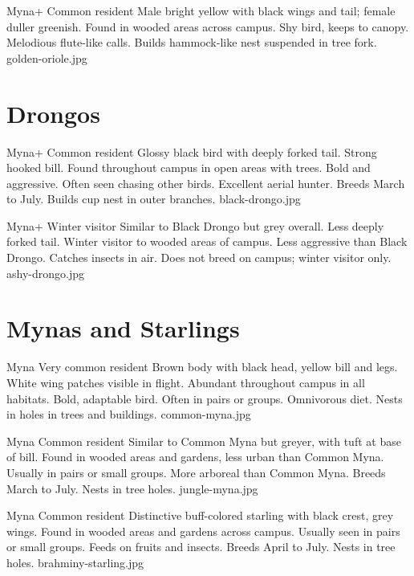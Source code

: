 \documentclass[aspectratio=169]{beamer}
\begin{document}
{Myna+}
{Common resident}
{Male bright yellow with black wings and tail; female duller greenish.}
{Found in wooded areas across campus.}
{Shy bird, keeps to canopy. Melodious flute-like calls.}
{Builds hammock-like nest suspended in tree fork.}
{golden-oriole.jpg}

\section{Drongos}
{Myna+}
{Common resident}
{Glossy black bird with deeply forked tail. Strong hooked bill.}
{Found throughout campus in open areas with trees.}
{Bold and aggressive. Often seen chasing other birds. Excellent aerial hunter.}
{Breeds March to July. Builds cup nest in outer branches.}
{black-drongo.jpg}

{Myna+}
{Winter visitor}
{Similar to Black Drongo but grey overall. Less deeply forked tail.}
{Winter visitor to wooded areas of campus.}
{Less aggressive than Black Drongo. Catches insects in air.}
{Does not breed on campus; winter visitor only.}
{ashy-drongo.jpg}

\section{Mynas and Starlings}
{Myna}
{Very common resident}
{Brown body with black head, yellow bill and legs. White wing patches visible in flight.}
{Abundant throughout campus in all habitats.}
{Bold, adaptable bird. Often in pairs or groups. Omnivorous diet.}
{Nests in holes in trees and buildings.}
{common-myna.jpg}

{Myna}
{Common resident}
{Similar to Common Myna but greyer, with tuft at base of bill.}
{Found in wooded areas and gardens, less urban than Common Myna.}
{Usually in pairs or small groups. More arboreal than Common Myna.}
{Breeds March to July. Nests in tree holes.}
{jungle-myna.jpg}

{Myna}
{Common resident}
{Distinctive buff-colored starling with black crest, grey wings.}
{Found in wooded areas and gardens across campus.}
{Usually seen in pairs or small groups. Feeds on fruits and insects.}
{Breeds April to July. Nests in tree holes.}
{brahminy-starling.jpg}
\end{document}
